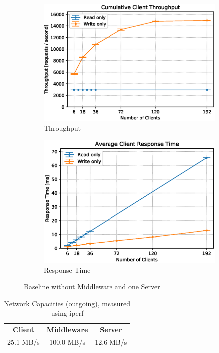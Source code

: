 \documentclass[11pt,a4paper]{article}
\begin{document}
\begin{figure}
    \begin{subfigure}{.5\textwidth}
        \includegraphics[width=1\linewidth]{plots/2_1_throughput.eps}
        \caption{Throughput}
    \end{subfigure}
    \begin{subfigure}{.5\textwidth}
        \includegraphics[width=1\linewidth]{plots/2_1_latency.eps}
        \caption{Response Time}
    \end{subfigure}
    \caption{Baseline without Middleware and one Server}
    \label{fig:2-1}
\end{figure}

\begin{table}
    \begin{center}
        \scriptsize{
          \begin{tabular}{|ccc|}
            \hline
            \textbf{Client} & \textbf{Middleware} & \textbf{Server}\\
            25.1 MB/s & 100.0 MB/s & 12.6 MB/s\\
            \hline
          \end{tabular}
        }
      \caption{Network Capacities (outgoing), measured using iperf}
      \label{link-caps}
    \end{center}
\end{table}
\end{document}

